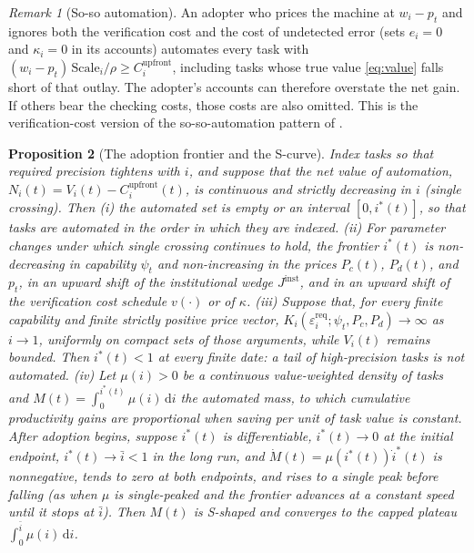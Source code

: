 \documentclass[12pt]{article}
\theoremstyle{plain}
\newtheorem{proposition}{Proposition}[section]
\theoremstyle{definition}
\theoremstyle{remark}
\newtheorem{remark}[proposition]{Remark}
\begin{document}
\begin{remark}[So-so automation]\label{rem:soso}
An adopter who prices the machine at $w_i - p_t$ and ignores both the
verification cost and the cost of undetected error (sets $e_i = 0$ and
$\kappa_i = 0$ in its accounts) automates every task with
$(w_i - p_t)\,\mathrm{Scale}_i/\rho \ge C_i^{\mathrm{upfront}}$,
including tasks whose true value \eqref{eq:value} falls short of that
outlay.
The adopter's accounts can therefore overstate the net gain. If
others bear the checking costs, those costs are also omitted. This is the
verification-cost version of the so-so-automation pattern of
\citet{AcemogluRestrepo2019NewTasks}.
\end{remark}

\begin{proposition}[The adoption frontier and the S-curve]\label{prop:scurve}
Index tasks so that required precision tightens with $i$, and suppose
that the net value of automation,
$N_i(t) = V_i(t) - C_i^{\mathrm{upfront}}(t)$, is continuous and strictly
decreasing in $i$ (single crossing). Then (i) the
automated set is empty or an interval $[0, i^{*}(t)]$, so that tasks are
automated in the order in which they are indexed. (ii) For parameter
changes under which single crossing continues to hold, the frontier $i^{*}(t)$ is
non-decreasing in capability $\psi_t$ and non-increasing in the prices
$P_c(t)$, $P_d(t)$, and $p_t$,
in an upward shift of the institutional wedge $J^{\mathrm{inst}}$, and in an
upward shift of the verification cost schedule $v(\cdot)$ or of
$\kappa$. (iii) Suppose that, for every finite capability and finite
strictly positive price vector,
$K_i(\varepsilon_i^{\mathrm{req}};\psi_t,P_c,P_d)\to\infty$ as
$i\to1$, uniformly on compact sets of those arguments, while
$V_i(t)$ remains bounded. Then $i^{*}(t)<1$ at every finite date: a tail
of high-precision tasks is not automated. (iv) Let $\mu(i)>0$ be a
continuous value-weighted density of tasks and
$M(t) = \int_0^{i^{*}(t)} \mu(i)\,\mathrm{d}i$ the automated mass, to
which cumulative productivity gains are proportional when saving per
unit of task value is constant. After adoption begins, suppose
$i^*(t)$ is differentiable, $i^*(t)\to0$ at the initial endpoint,
$i^*(t)\to\bar i<1$ in the long run, and
$\dot M(t)=\mu(i^*(t))\dot i^*(t)$ is nonnegative, tends to zero at
both endpoints, and rises to a single peak before falling (as when
$\mu$ is single-peaked and the frontier advances at a constant speed
until it stops at $\bar i$). Then $M(t)$
is S-shaped and converges to the capped plateau
$\int_0^{\bar i}\mu(i)\,\mathrm{d}i$.
\end{proposition}
\end{document}
